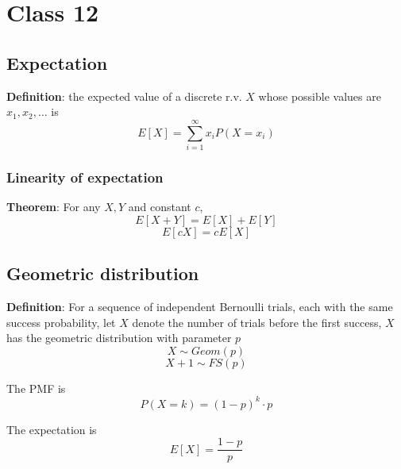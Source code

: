\chapter{Class 12}

\section{Expectation}
\begin{framed}
   \textbf{Definition}: the expected value of a discrete r.v. $X$ whose possible values are $x_1, x_2, \hdots$ is
   \[
      E[X] = \sum_{i = 1}^{\infty} x_i P(X = x_i)
   \] 
\end{framed}

\subsection{Linearity of expectation}

\begin{framed}
   \textbf{Theorem}: For any $X, Y$ and constant $c$, 
   \[
     E\left[ X + Y\right]  = E\left[ X \right]  + E\left[ Y\right] 
   \] 
   \[
     E\left[ cX\right]  = c E\left[ X\right] 
   \] 
\end{framed}

\section{Geometric distribution}

\begin{framed}
   \textbf{Definition}: For a sequence of independent Bernoulli trials, each with the same success probability, let $X$ denote the number of trials before the first success, $X$ has the geometric distribution with parameter $p$ 
   \[
     X \sim Geom(p)
   \] 
   \[
     X + 1 \sim FS(p)
   \] 

   The PMF is 
   \[
     P(X = k) =  (1-p)^k  \cdot p
   \] 

   The expectation is 
   \[
      E[X] = \frac{1 - p}{p}
   \] 

   
  
\end{framed}





